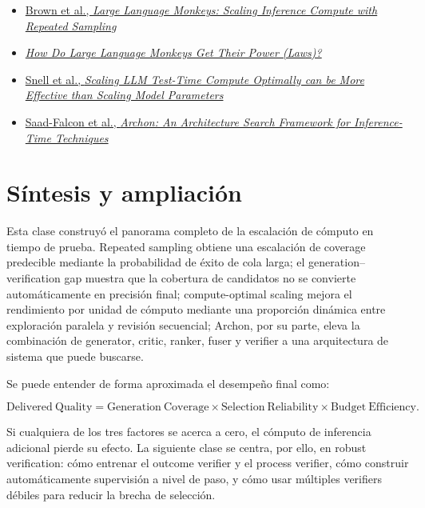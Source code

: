 \documentclass[a4paper]{article}
\begin{document}
\begin{itemize}
    \item \href{https://arxiv.org/abs/2407.21787}{Brown et al., \emph{Large Language Monkeys: Scaling Inference Compute with Repeated Sampling}}
    \item \href{https://arxiv.org/abs/2502.17578}{\emph{How Do Large Language Monkeys Get Their Power (Laws)?}}
    \item \href{https://arxiv.org/abs/2408.03314}{Snell et al., \emph{Scaling LLM Test-Time Compute Optimally can be More Effective than Scaling Model Parameters}}
    \item \href{https://arxiv.org/abs/2409.15254}{Saad-Falcon et al., \emph{Archon: An Architecture Search Framework for Inference-Time Techniques}}
\end{itemize}

\section{Síntesis y ampliación}

Esta clase construyó el panorama completo de la escalación de cómputo en tiempo de prueba. Repeated sampling obtiene una escalación de coverage predecible mediante la probabilidad de éxito de cola larga; el generation--verification gap muestra que la cobertura de candidatos no se convierte automáticamente en precisión final; compute-optimal scaling mejora el rendimiento por unidad de cómputo mediante una proporción dinámica entre exploración paralela y revisión secuencial; Archon, por su parte, eleva la combinación de generator, critic, ranker, fuser y verifier a una arquitectura de sistema que puede buscarse.

Se puede entender de forma aproximada el desempeño final como:

$$
\mathrm{Delivered\ Quality}
=\mathrm{Generation\ Coverage}
\times\mathrm{Selection\ Reliability}
\times\mathrm{Budget\ Efficiency}.
$$

Si cualquiera de los tres factores se acerca a cero, el cómputo de inferencia adicional pierde su efecto. La siguiente clase se centra, por ello, en robust verification: cómo entrenar el outcome verifier y el process verifier, cómo construir automáticamente supervisión a nivel de paso, y cómo usar múltiples verifiers débiles para reducir la brecha de selección.
\end{document}
